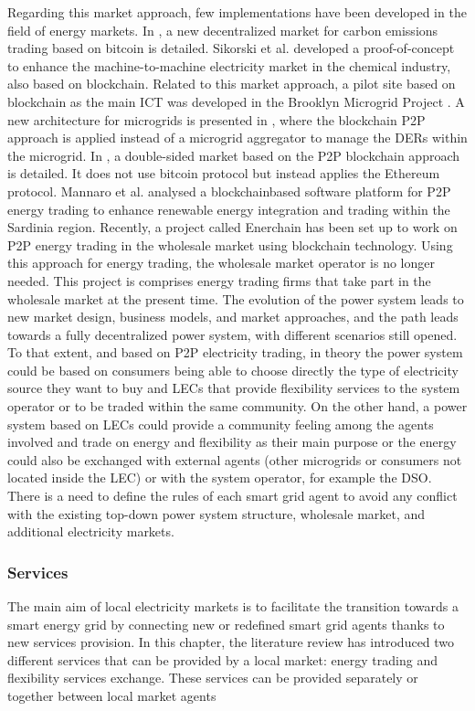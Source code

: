 Regarding this market approach, few implementations have been developed in the field of energy markets. In \cite{al2015bitcoin}, a new decentralized market for carbon emissions trading based on bitcoin is detailed. Sikorski et al. \cite{sikorski2017blockchain} developed a proof-of-concept to enhance the machine-to-machine electricity market in the chemical industry, also based on blockchain. Related to this market approach, a pilot site based on blockchain as the main ICT was developed in the Brooklyn Microgrid Project \cite{mengelkamp2018designing}. A new architecture for microgrids is presented in \cite{munsing2017blockchains}, where the blockchain P2P approach is applied instead of a microgrid aggregator to manage the DERs within the microgrid. In \cite{mengelkamp2018blockchain}, a double-sided market based on the P2P blockchain approach is detailed. It does not use bitcoin protocol but instead applies the Ethereum protocol. Mannaro et al. \cite{mannaro2017crypto} analysed a blockchainbased software platform for P2P energy trading to enhance renewable energy integration and trading within the Sardinia region. Recently, a project called Enerchain \cite{Enerchain} has been set up to work on P2P energy trading in the wholesale market using blockchain technology. Using this approach for energy trading, the wholesale market operator is no longer needed. This project is comprises energy trading firms that take part in the wholesale market at the present time. The evolution of the power system leads to new market design, business models, and market approaches, and the path leads towards a fully decentralized power system, with different scenarios still opened. To that extent, and based on P2P electricity trading, in theory the power system could be based on consumers being able to choose directly the type of electricity source they want to buy and LECs that provide flexibility services to the system operator or to be traded within the same community. On the other hand, a power system based on LECs could provide a community feeling among the agents involved and trade on energy and flexibility as their main purpose or the energy could also be exchanged with external agents (other microgrids or consumers not located inside the LEC) or with the system operator, for example the DSO. There is a need to define the rules of each smart grid agent to avoid any conflict with the existing top-down power system structure, wholesale market, and additional electricity markets.


\subsubsection{Services}
The main aim of local electricity markets is to facilitate the transition towards a smart energy grid by connecting new or redefined smart grid agents thanks to new services provision. In this chapter, the literature review has introduced two different services that can be provided by a local market: energy trading and flexibility services exchange. These services can be provided separately or together between local market agents 

